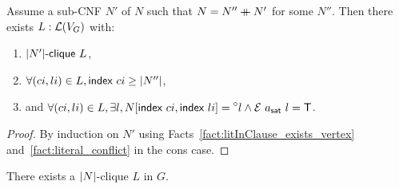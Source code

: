 \begin{lemma}
  Assume a sub-CNF $N'$ of $N$ such that $N = N'' \mathbin{+\mkern-10mu+} N'$ for some $N''$. Then there exists $L : \mathcal{L} (V_G)$ with: 
  \begin{enumerate}
    \item $\text{$|N'|$-\textsf{clique}}~L$, 
    \item $\forall (ci, li) \in L, \textsf{index}~ci \ge |N''|$, 
    \item and $\forall (ci, li) \in L, \exists l, N[\textsf{index}~ci, \textsf{index}~li] = \prescript{\circ}{}l \land \mathcal{E}~a_\textsf{sat}~l = \mathsf{T}$.
  \end{enumerate}
\end{lemma}
\begin{proof}
  By induction on $N'$ using Facts~\ref{fact:litInClause_exists_vertex} and~\ref{fact:literal_conflict} in the cons case.
\end{proof}

\begin{corollary}
  There exists a $|N|$-clique $L$ in $G$.
\end{corollary}

